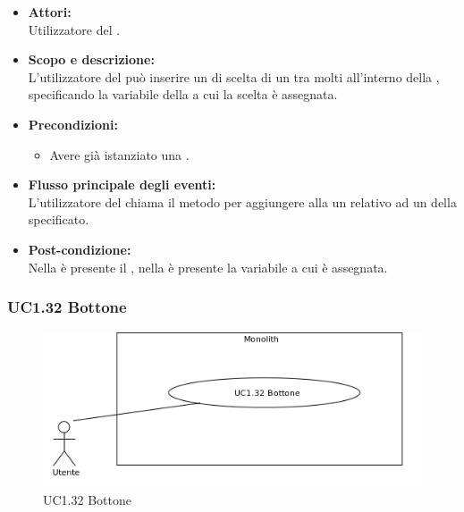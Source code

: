 \begin{itemize}
	\item \textbf{Attori:}
	\\Utilizzatore del .
	\item \textbf{Scopo e descrizione:} 
	\\L'utilizzatore del  può inserire un   di scelta di un  tra molti all'interno della , specificando la variabile della  a cui la scelta è assegnata.
	\item \textbf{Precondizioni:}
	\begin{itemize}
		\item Avere già istanziato una .
	\end{itemize}
	\item \textbf{Flusso principale degli eventi:}
	\\L'utilizzatore del  chiama il metodo per aggiungere alla  un  relativo ad un  della  specificato.
	\item \textbf{Post-condizione:}
	\\Nella {} è presente il , nella  è presente la variabile a cui è assegnata.
\end{itemize}

\subsubsection{UC1.32 Bottone} \label{UC1.32}

\begin{figure}[H]
	\centering
	\includegraphics[width=15cm]{../../documenti/AnalisiDeiRequisiti/Diagrammi_img/uc1_32.png}
	\caption{UC1.32 Bottone}
\end{figure}

